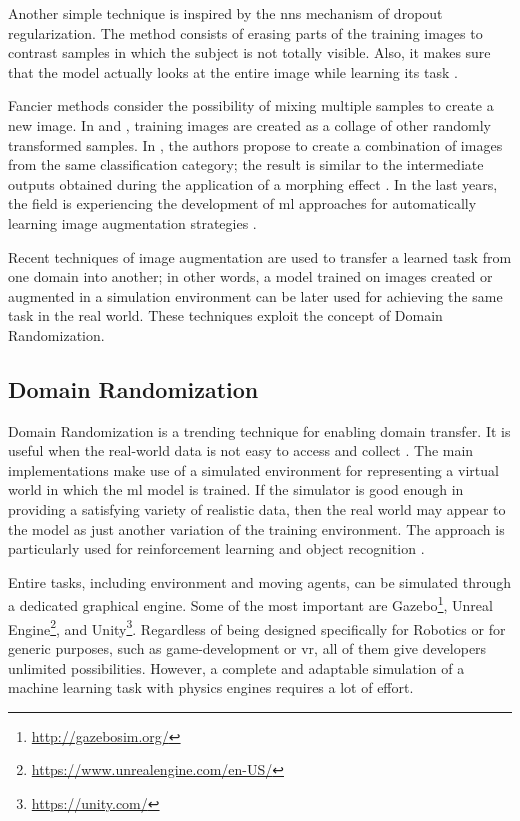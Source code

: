 Another simple technique is inspired by the \gls{nn}s mechanism of dropout regularization. The method consists of erasing parts of the training images to contrast samples in which the subject is not totally visible. Also, it makes sure that the model actually looks at the entire image while learning its task \cite{wan2013dropconn} \cite{zhong2017random}. 

Fancier methods consider the possibility of mixing multiple samples to create a new image. In \cite{Takahashi_2020} and \cite{summers2019improved}, training images are created as a collage of other randomly transformed samples. In \cite{Lemley_2017}, the authors propose to create a combination of images from the same classification category; the result is similar to the intermediate outputs obtained during the application of a morphing effect \cite{wiki_morphing}. In the last years, the field is experiencing the development of \gls{ml} approaches for automatically learning image augmentation strategies \cite{zoph2019learning} \cite{cubuk2019autoaugment}.

Recent techniques of image augmentation are used to transfer a learned task from one domain into another; in other words, a model trained on images created or augmented in a simulation environment can be later used for achieving the same task in the real world. These techniques exploit the concept of Domain Randomization.



\subsection{Domain Randomization}
\label{subsec:domain-randomization}

Domain Randomization is a trending technique for enabling domain transfer. It is useful when the real-world data is not easy to access and collect \cite{mehta2019active}. The main implementations make use of a simulated environment for representing a virtual world in which the \gls{ml} model is trained. If the simulator is good enough in providing a satisfying variety of realistic data, then the real world may appear to the model as just another variation of the training environment. The approach is particularly used for reinforcement learning \cite{imitation_learning_3d_navigation} and object recognition \cite{weng2019DR} \cite{tobin2017domain}.

Entire tasks, including environment and moving agents, can be simulated through a dedicated graphical engine. Some of the most important are Gazebo\footnote{\url{http://gazebosim.org/}}, Unreal Engine\footnote{\url{https://www.unrealengine.com/en-US/}}, and Unity\footnote{\url{https://unity.com/}}. Regardless of being designed specifically for Robotics or for generic purposes, such as game-development or \gls{vr}, all of them give developers unlimited possibilities. However, a complete and adaptable simulation of a machine learning task with physics engines requires a lot of effort.

